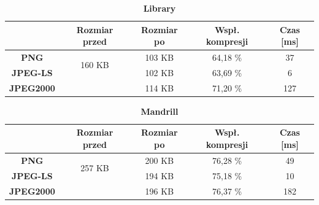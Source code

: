 \begin{table}[!h]
	\centering
	\caption{\textbf{Library}}
	\label{my-label}
	\begin{tabular}{|c|c|c|c|c|}                                             
		\hline
		& \textbf{Rozmiar przed} & \textbf{Rozmiar po} & \textbf{Wspł. kompresji} & \textbf{Czas {[}ms{]}} \\ \hline 
		\textbf{PNG}      &          \multicolumn{1}{c|}{\multirow{2}{*}{160 KB}}             &      103 KB               &    64,18 \%                     &           37                  \\\cline{3-5}
		\textbf{JPEG-LS}  &                        &     102 KB                &        63,69 \%                 &           6               \\\cline{3-5}
		\textbf{JPEG2000} &                        &     114 KB                &        71,20 \%                 &        127              \\ \hline
	\end{tabular}
\end{table}

\begin{table}[!h]
	\centering
	\caption{\textbf{Mandrill}}
	\label{my-label}
	\begin{tabular}{|c|c|c|c|c|}                                             
		\hline
		& \textbf{Rozmiar przed} & \textbf{Rozmiar po} & \textbf{Wspł. kompresji} & \textbf{Czas {[}ms{]}} \\ \hline 
		\textbf{PNG}      &          \multicolumn{1}{c|}{\multirow{2}{*}{257 KB}}             &     200 KB                &        76,28 \%                 &         49                    \\\cline{3-5}
		\textbf{JPEG-LS}  &                        &       194 KB             &        75,18 \%                &           10               \\\cline{3-5}
		\textbf{JPEG2000} &                        &       196 KB              &          76,37 \%               &     182                 \\ \hline
	\end{tabular}
\end{table}

